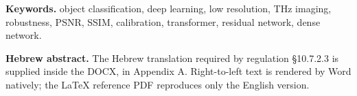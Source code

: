 \noindent\textbf{Keywords.}\quad
object classification, deep learning, low resolution, THz imaging, robustness,
PSNR, SSIM, calibration, transformer, residual network, dense network.

\bigskip

\noindent\textbf{Hebrew abstract.}\quad
The Hebrew translation required by regulation \S 10.7.2.3 is supplied
inside the DOCX, in Appendix A. Right-to-left text is rendered by Word
natively; the LaTeX reference PDF reproduces only the English version.
